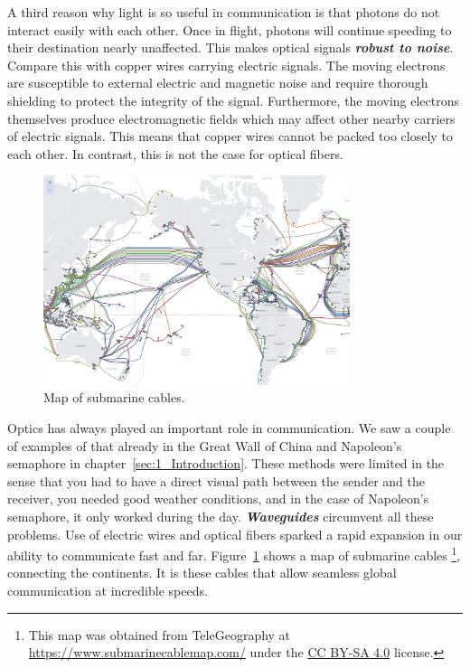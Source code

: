 A third reason why light is so useful in communication is that photons do not interact easily with each other.
Once in flight, photons will continue speeding to their destination nearly unaffected.
This makes optical signals \textit{\textbf{robust to noise}}.
Compare this with copper wires carrying electric signals.
The moving electrons are susceptible to external electric and magnetic noise and require thorough shielding to protect the integrity of the signal.
Furthermore, the moving electrons themselves produce electromagnetic fields which may affect other nearby carriers of electric signals.
This means that copper wires cannot be packed too closely to each other.
In contrast, this is not the case for optical fibers.

\begin{figure}[t]
    \centering
    \includegraphics[width=0.8\textwidth]{lesson5/5-1_underwater_cable_map.png}
    \caption[Underwater cabel map]{Map of submarine cables.}
    \label{fig:5-1_underwater_cable_map}
\end{figure}

Optics has always played an important role in communication.
We saw a couple of examples of that already in the Great Wall of China and Napoleon's semaphore in chapter~\ref{sec:1_Introduction}.
These methods were limited in the sense that you had to have a direct visual path between the sender and the receiver, you needed good weather conditions, and in the case of Napoleon's semaphore, it only worked during the day.
\textit{\textbf{Waveguides}} circumvent all these problems.
Use of electric wires and optical fibers sparked a rapid expansion in our ability to communicate fast and far.
Figure~\ref{fig:5-1_underwater_cable_map} shows a map of submarine cables \footnote{This map was obtained from TeleGeography at \href{https://www.submarinecablemap.com/}{https://www.submarinecablemap.com/} under the \href{https://creativecommons.org/licenses/by-sa/4.0/}{CC BY-SA 4.0} license.}, connecting the continents.
It is these cables that allow seamless global communication at incredible speeds.

